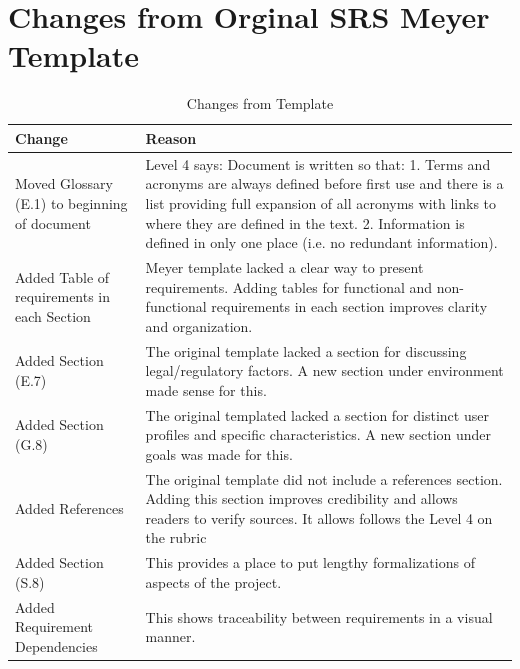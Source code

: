 \documentclass{article}
\begin{document}
\section*{Changes from Orginal SRS Meyer Template}
\begin{table}[H]
\caption{Changes from Template} \label{ChangesFromTemplate}
\begin{tabularx}{\textwidth}{|p{4cm}|>{\raggedright\arraybackslash}X|}
\hline
\textbf{Change} & \textbf{Reason} \\
\hline
Moved Glossary (E.1) to beginning of document & Level 4 says: Document is written so that: 1. Terms and acronyms are always defined before first use and there is a list providing full expansion of all acronyms with links to where they are defined in the text. 2. Information is defined in only one place (i.e. no redundant information). \\
\hline
Added Table of requirements in each Section & Meyer template lacked a clear way to present requirements. Adding tables for functional and non-functional requirements in each section improves clarity and organization. \\
\hline
Added Section (E.7) & The original template lacked a section for discussing legal/regulatory factors. A new section under environment made sense for this. \\
\hline
Added Section (G.8) & The original templated lacked a section for distinct user profiles and specific characteristics. A new section under goals was made for this.\\
\hline
Added References & The original template did not include a references section. Adding this section improves credibility and allows readers to verify sources. It allows follows the Level 4 on the rubric \\
\hline
Added Section (S.8) & This provides a place to put lengthy formalizations of aspects of the project. \\
\hline
Added Requirement Dependencies & This shows traceability between requirements in a visual manner. \\
\end{tabularx}
\end{table}

\newpage

\medskip

\hypertarget{glossary-catan}{}
\hypertarget{glossary-ai}{}
\hypertarget{glossary-rl}{}
\hypertarget{glossary-dt}{}
\hypertarget{glossary-cv}{}
\hypertarget{glossary-llm}{}
\hypertarget{glossary-gamestate}{}
\end{document}
